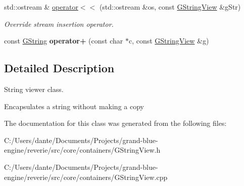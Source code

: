 \begin{DoxyCompactItemize}
\mbox{\label{classrev_1_1_g_string_view_a21b7f091b0235c75d3f98ba81ed3763a}} 
std\+::ostream \& \mbox{\hyperlink{classrev_1_1_g_string_view_a21b7f091b0235c75d3f98ba81ed3763a}{operator$<$$<$}} (std\+::ostream \&os, const \mbox{\hyperlink{classrev_1_1_g_string_view}{G\+String\+View}} \&g\+Str)
\begin{DoxyCompactList}\small\item\em Override stream insertion operator. \end{DoxyCompactList}\item 
\mbox{\label{classrev_1_1_g_string_view_a91ea2384f589c8a978c97b6b9fdeed69}} 
const \mbox{\hyperlink{classrev_1_1_g_string}{G\+String}} {\bfseries operator+} (const char $\ast$c, const \mbox{\hyperlink{classrev_1_1_g_string_view}{G\+String\+View}} \&g)
\end{DoxyCompactItemize}


\subsection{Detailed Description}
String viewer class. 

Encapsulates a string without making a copy 

The documentation for this class was generated from the following files\+:\begin{DoxyCompactItemize}
\item 
C\+:/\+Users/dante/\+Documents/\+Projects/grand-\/blue-\/engine/reverie/src/core/containers/G\+String\+View.\+h\item 
C\+:/\+Users/dante/\+Documents/\+Projects/grand-\/blue-\/engine/reverie/src/core/containers/G\+String\+View.\+cpp\end{DoxyCompactItemize}
